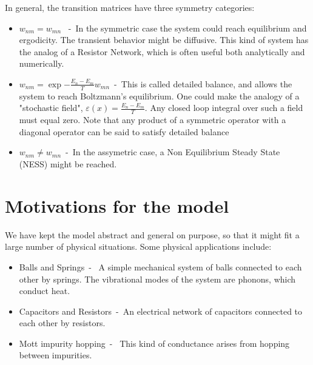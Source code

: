 

In general, the transition matrices have three symmetry categories:
\begin{itemize}
  \item 
    $w_{nm} = w_{mn}$ \ -\ In the symmetric case the system could reach
      equilibrium and ergodicity. The transient behavior might be diffusive. 
      This kind of system has the analog of a Resistor Network, which is often
      useful both analytically and numerically.
  \item
    $w_{nm} = \exp{-\frac{E_n-E_m}{T}} w_{mn}$\ -\ This is called detailed balance,
      and allows the system to reach Boltzmann's equilibrium. One could make
      the analogy of a "stochastic field", $\varepsilon(x) = \frac{E_n-E_m}{T}$.
      Any closed loop integral over such a field must equal zero.
      Note that any product of a symmetric operator with a diagonal operator
      can be said to satisfy detailed balance \cite{kolmogoroff_zur_1936}
  \item
    $w_{nm} \ne w_{mn}$\ -\ In the assymetric case, a Non Equilibrium Steady
      State (NESS) might be reached. 
\end{itemize}





\section{Motivations for the model}

We have kept the model abstract and general on purpose, so that it
might fit a large number of physical situations. Some physical applications include:
%
\begin{itemize}
  \item
    Balls and Springs\ - \ A simple mechanical system of balls connected to each
      other by springs. The vibrational modes of the system are phonons, which conduct heat.
  \item
    Capacitors and Resistors\ -\ An electrical network of capacitors connected to each other
      by resistors.
  \item 
    Mott impurity hopping\ - \ This kind of conductance arises from hopping 
      between impurities.
\end{itemize}


